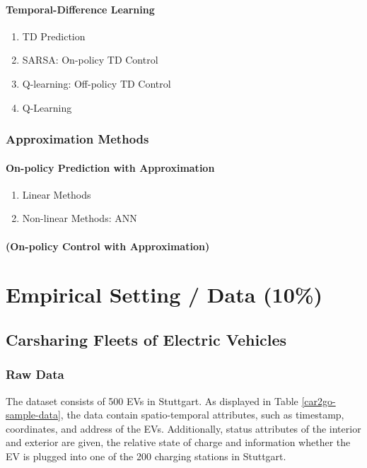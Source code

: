 \documentclass[a4paper, twoside, 12pt]{article}
\begin{document}
\paragraph{Temporal-Difference Learning}
\label{sec:orgee48e53}
\begin{enumerate}
\item TD Prediction
\label{sec:orgd87e970}
\item SARSA: On-policy TD Control
\label{sec:org421ddd9}
\item Q-learning: Off-policy TD Control
\label{sec:orgecec2a8}
\item Q-Learning
\label{sec:org70086b0}
\end{enumerate}
\subsubsection{Approximation Methods}
\label{sec:org7e9f519}
\paragraph{On-policy Prediction with Approximation}
\label{sec:org2122d4c}
\begin{enumerate}
\item Linear Methods
\label{sec:org0f66302}
\item Non-linear Methods: ANN
\label{sec:org44fea53}
\end{enumerate}
\paragraph{(On-policy Control with Approximation)}
\label{sec:org3c8b236}
\clearpage
\section{Empirical Setting / Data (10\%)}
\label{sec:org04a734e}
\subsection{Carsharing Fleets of Electric Vehicles}
\label{sec:orgeecff24}
\subsubsection{Raw Data}
\label{sec:org4880085}
The dataset consists of 500 EVs in Stuttgart. As displayed in Table
\ref{car2go-sample-data}, the data contain spatio-temporal attributes, such as
timestamp, coordinates, and address of the EVs. Additionally, status attributes
of the interior and exterior are given, the relative state of charge and
information whether the EV is plugged into one of the 200 charging stations in
Stuttgart.
\end{document}
